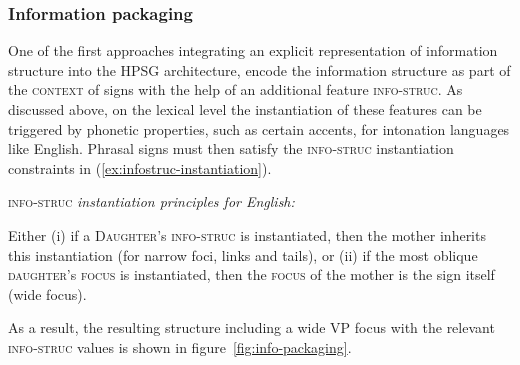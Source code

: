 \documentclass[output=paper]{langsci/langscibook}
\begin{document}
\subsubsection{Information packaging \citep{EV96a}}

One of the first approaches integrating an explicit representation of
information structure into the HPSG architecture, \cite{EV96a} encode
the information structure as part of the \textsc{context} of signs
with the help of an additional feature \textsc{info-struc}. As
discussed above, on the lexical level the instantiation of these
features can be triggered by phonetic properties, such as certain
accents, for intonation languages like English. Phrasal signs must
then satisfy the \textsc{info-struc} instantiation constraints in
(\ref{ex:infostruc-instantiation}).
\begin{exe}
  \ex\label{ex:infostruc-instantiation} \textsc{info-struc} \textit{instantiation principles for English:}
  \begin{xlist}
    \exi{} Either (i) if a \textsc{Daughter}'s \textsc{info-struc} is instantiated, then the mother inherits this instantiation (for narrow foci, links and tails),
    \exi{} or (ii) if the most oblique \textsc{daughter}'s \textsc{focus} is instantiated, then the \textsc{focus} of the mother is the sign itself (wide focus).
  \end{xlist}
\end{exe}

As a result, the resulting structure including a wide VP focus with
the relevant \textsc{info-struc} values is shown in
figure~\ref{fig:info-packaging}.
\end{document}
